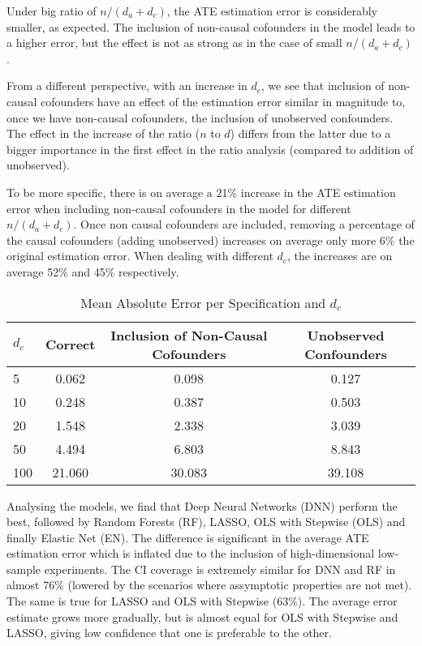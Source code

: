 \documentclass{article}
\numberwithin{equation}{section}
\begin{document}
Under big ratio of $n / (d_a + d_c)$, the ATE estimation error is considerably smaller, as expected. The inclusion of non-causal cofounders in the model leads to a higher error, but the effect is not as strong as in the case of small $n / (d_a + d_c)$.

From a different perspective, with an increase in $d_c$, we see that inclusion of non-causal cofounders have an effect of the estimation error similar in magnitude to, once we have non-causal cofounders, the inclusion of unobserved confounders. The effect in the increase of the ratio ($n$ to $d$) differs from the latter due to a bigger importance in the first effect in the ratio analysis (compared to addition of unobserved).

To be more specific, there is on average a 21\% increase in the ATE estimation error when including non-causal cofounders in the model for different $n / (d_a + d_c)$. Once non causal cofounders are included, removing a percentage of the causal cofounders (adding unobserved) increases on average only more 6\% the original estimation error. When dealing with different $d_c$, the increases are on average 52\% and 45\% respectively. 

\begin{table}[H]
    \centering
    \begin{tabular}{lccc}
        \toprule
        $d_c$ & Correct & Inclusion of Non-Causal Cofounders & Unobserved Confounders \\
        \midrule
        5 & 0.062 & 0.098 & 0.127 \\
        10 & 0.248 & 0.387 & 0.503 \\
        20 & 1.548 & 2.338 & 3.039 \\
        50 & 4.494 & 6.803 & 8.843 \\
        100 & 21.060 & 30.083 & 39.108 \\
        \bottomrule
    \end{tabular}
    \caption{Mean Absolute Error per Specification and $d_c$}
\end{table}

Analysing the models, we find that Deep Neural Networks (DNN) perform the best, followed by Random Forests (RF), LASSO, OLS with Stepwise (OLS) and finally Elastic Net (EN). The difference is significant in the average ATE estimation error which is inflated due to the inclusion of high-dimensional low-sample experiments. The CI coverage is extremely similar for DNN and RF in almost 76\% (lowered by the scenarios where assymptotic properties are not met). The same is true for LASSO and OLS with Stepwise (63\%). The average error estimate grows more gradually, but is almost equal for OLS with Stepwise and LASSO, giving low confidence that one is preferable to the other.
\end{document}
